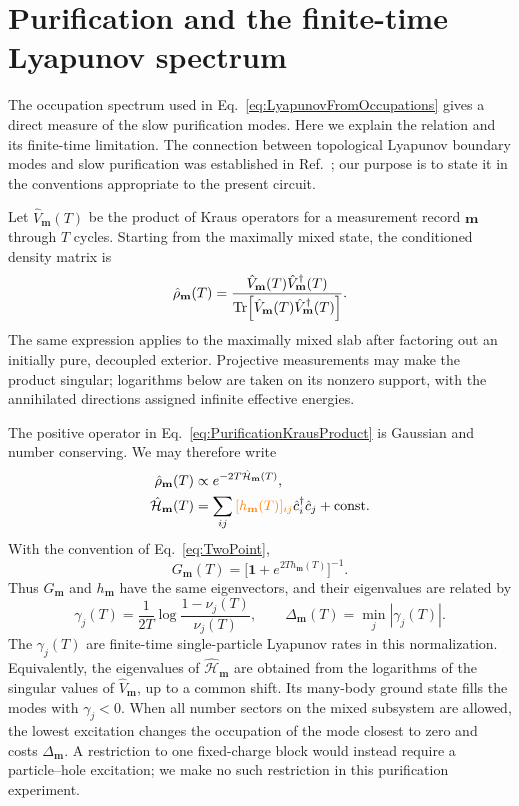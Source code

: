 \documentclass[aps,prb,10pt,twocolumn,superscriptaddress,longbibliography,floatfix]{revtex4-2}
\newcommand{\rec}{\mathbf m}   %
\newcommand{\claudeadd}[1]{{\color{orange}#1}}
\begin{document}
\FloatBarrier
{\color{blue}
\section{Purification and the finite-time Lyapunov spectrum}
\label{app:Lyapunov}

The occupation spectrum used in Eq.~\eqref{eq:LyapunovFromOccupations} gives a direct measure of the slow purification modes. Here we explain the relation and its finite-time limitation. The connection between topological Lyapunov boundary modes and slow purification was established in Ref.~\cite{XiaoKawabata2026}; our purpose is to state it in the conventions appropriate to the present circuit.

Let $\hat V_{\rec}(T)$ be the product of Kraus operators for a measurement record $\rec$ through $T$ cycles. Starting from the maximally mixed state, the conditioned density matrix is
\begin{equation}
    \hat\rho_{\rec}(T)=
    \frac{\hat V_{\rec}(T)\hat V_{\rec}^\dagger(T)}
    {\Tr[\hat V_{\rec}(T)\hat V_{\rec}^\dagger(T)]}.
    \label{eq:PurificationKrausProduct}
\end{equation}
The same expression applies to the maximally mixed slab after factoring out an initially pure, decoupled exterior. Projective measurements may make the product singular; logarithms below are taken on its nonzero support, with the annihilated directions assigned infinite effective energies.

The positive operator in Eq.~\eqref{eq:PurificationKrausProduct} is Gaussian and number conserving. We may therefore write
\begin{align}
    \hat\rho_{\rec}(T)&\propto e^{-2T\hat{\mathcal H}_{\rec}(T)},
    \nonumber\\
    \hat{\mathcal H}_{\rec}(T)
    &=\sum_{ij}\claudeadd{[h_{\rec}(T)]_{ij}}\hat c_i^\dagger\hat c_j
      +\text{const.}
    \label{eq:PurificationEffectiveHamiltonian}
\end{align}
\claudeadd{With the convention of Eq.~\eqref{eq:TwoPoint},}
\begin{equation}
    G_{\rec}(T)=\big[\mathbf{1}+e^{2T h_{\rec}(T)}\big]^{-1}.
    \label{eq:PurificationFermiFunction}
\end{equation}
Thus $G_{\rec}$ and $h_{\rec}$ have the same eigenvectors, and their eigenvalues are related by
\begin{equation}
    \gamma_j(T)=\frac{1}{2T}\log\frac{1-\nu_j(T)}{\nu_j(T)},
    \qquad \Delta_{\rec}(T)=\min_j|\gamma_j(T)|.
    \label{eq:PurificationFiniteTimeRates}
\end{equation}
The $\gamma_j(T)$ are finite-time single-particle Lyapunov rates in this normalization. Equivalently, the eigenvalues of $\hat{\mathcal H}_{\rec}$ are obtained from the logarithms of the singular values of $\hat V_{\rec}$, up to a common shift. Its many-body ground state fills the modes with $\gamma_j<0$. When all number sectors on the mixed subsystem are allowed, the lowest excitation changes the occupation of the mode closest to zero and costs $\Delta_{\rec}$. A restriction to one fixed-charge block would instead require a particle--hole excitation; we make no such restriction in this purification experiment.

}
\end{document}
